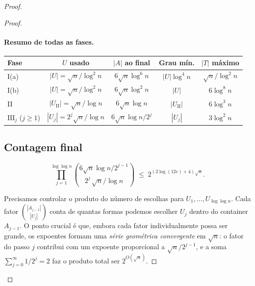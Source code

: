 \documentclass[reqno,a4paper,12pt]{amsart}
\begin{document}
\begin{proof}
\begin{proof}
    \paragraph{Resumo de todas as fases.}
    \begin{center}
      \renewcommand{\arraystretch}{1.6}
      \begin{tabular}{lcccc}
        \hline
        \textbf{Fase}                & \textbf{$U$ usado}                  & \textbf{$|A|$ ao final} & \textbf{Grau mín.}  & \textbf{$|T|$ máximo} \\
        \hline
        I(a)                         & $|U|=\sqrt{n}/\log^2 n$             & $6\sqrt{n}\log^6 n$     & $|U|\log^4 n$       & $\sqrt{n}/\log^2 n$   \\
        I(b)                         & $|U|=\sqrt{n}/\log^2 n$             & $6\sqrt{n}\log^2 n$     & $|U|$               & $6\log^8 n$           \\
        II                           & $|U_{\mathrm{II}}|=\sqrt{n}/\log n$ & $6\sqrt{n}\log n$       & $|U_{\mathrm{II}}|$ & $6\log^3 n$           \\
        $\mathrm{III}_j$ ($j\geq 1$) & $|U_j|=2^j\sqrt{n}/\log n$          & $6\sqrt{n}\log n/2^j$   & $|U_j|$             & $3\log^2 n$           \\
        \hline
      \end{tabular}
    \end{center}
    \bigskip

    \subsection*{Contagem final}

    \begin{claim}
      \label{contas}
      \[
        \prod_{j=1}^{\log\log n}
        \binom{6\sqrt{n}\log n / 2^{j-1}}{2^j\,\sqrt{n}/\log n}
        \;\leq\; 2^{(2\log(12e)+4)\sqrt{n}}.
      \]
    \end{claim}

    Precisamos controlar o produto do número de escolhas para $U_1, \ldots, U_{\log\log n}$.
    Cada fator $\binom{|A_{j-1}|}{|U_j|}$ conta de quantas formas podemos escolher $U_j$ dentro do
    container $A_{j-1}$. O ponto crucial é que, embora cada fator individualmente possa ser grande,
    os expoentes formam uma \emph{série geométrica convergente} em $\sqrt{n}$: o fator do passo $j$
    contribui com um expoente proporcional a $\sqrt{n}/2^{j-1}$, e a soma
    $\sum_{j=0}^\infty 1/2^j = 2$ faz o produto total ser $2^{O(\sqrt{n})}$.


\end{proof}
\end{proof}
\end{document}
